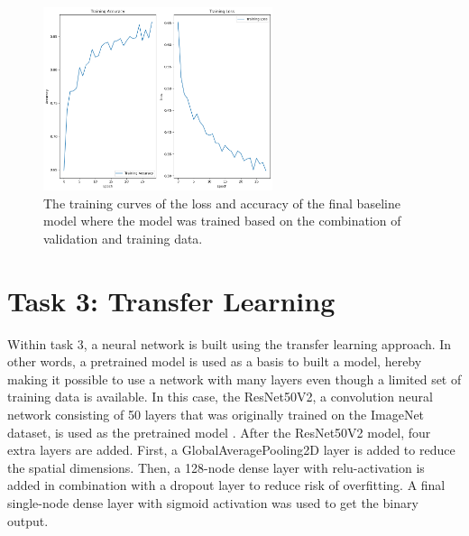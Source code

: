 \documentclass[conference]{IEEEtran}
\begin{document}
\begin{figure}[t] \centering \includegraphics[width=0.6\textwidth]{fig_task2_training_curves_train_final_model.png}
	\caption{The training curves of the loss and accuracy of the final baseline model where the model was trained based on the combination of validation and training data.} 	
	\label{fig:task2_curves_final} 
\end{figure}

\section{Task 3: Transfer Learning}\label{sec:task_3}


Within task 3, a neural network is built using the transfer learning approach. In other words, a pretrained model is used as a basis to built a model, hereby making it possible to use a network with many layers even though a limited set of training data is available. 
In this case, the ResNet50V2, a convolution neural network consisting of 50 layers that was originally trained on the ImageNet dataset, is used as the pretrained model \cite{resnet}. After the ResNet50V2 model, four extra layers are added. First, a GlobalAveragePooling2D layer is added to reduce the spatial dimensions. Then, a 128-node dense layer with relu-activation is added in combination with a dropout layer to reduce risk of overfitting. A final single-node dense layer with sigmoid activation was used to get the binary output.
\end{document}
